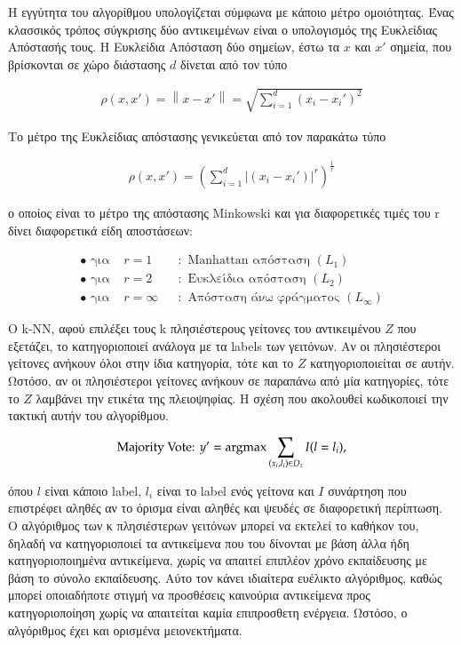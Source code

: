 \documentclass[12pt]{article}
\newcommand{\norm}[1]{\left\lVert#1\right\rVert}
\newcommand{\argmax}{\operatornamewithlimits{argmax}}
\begin{document}
Η εγγύτητα του αλγορίθμου υπολογίζεται σύμφωνα με κάποιο μέτρο ομοιότητας. Ένας κλασσικός τρόπος σύγκρισης δύο αντικειμένων είναι ο υπολογισμός της Ευκλείδιας Απόστασής τους. Η Ευκλείδια Απόσταση δύο σημείων, έστω τα \(x\) και \(x'\) σημεία, που βρίσκονται σε χώρο διάστασης \(d\) δίνεται από τον τύπο

\begin{align*}
	ρ(x,x') = \norm{x- x'} =\sqrt{\sum_{i=1}^{d}(x_i - x_{i}')^2}
\end{align*} 

Το μέτρο της Ευκλείδιας απόστασης γενικεύεται από τον παρακάτω τύπο

\begin{align*}
	ρ(x,x') = (\sum_{i=1}^{d}|(x_i - x_{i}')|^r)^{\frac{1}{r}}
\end{align*}

ο οποίος είναι το μέτρο της απόστασης Minkowski και για διαφορετικές τιμές του r δίνει διαφορετικά είδη αποστάσεων:

\begin{align*}
	\bullet \text{ για } &r = 1 &&: \text{ Manhattan απόσταση } (L_1) \\
	\bullet \text{ για } &r = 2 &&: \text{ Ευκλείδια απόσταση } (L_2) \\
	\bullet \text{ για } &r = \infty &&: \text{ Απόσταση άνω φράγματος } (L_{\infty})		
\end{align*}

O k-NN, αφού επιλέξει τους k πλησιέστερους γείτονες του αντικειμένου \(Z\) που εξετάζει, το κατηγοριοποιεί ανάλογα με τα labels των γειτόνων. Αν οι πλησιέστεροι γείτονες ανήκουν όλοι στην ίδια κατηγορία, τότε και το \(Ζ\) κατηγοριοποιείται σε αυτήν. Ωστόσο, αν οι πλησιέστεροι γείτονες ανήκουν σε παραπάνω από μία κατηγορίες, τότε το \(Z\) λαμβάνει την ετικέτα της πλειοψηφίας. Η σχέση που ακολουθεί κωδικοποιεί την τακτική αυτήν του αλγορίθμου.

\begin{align*}
	\text{Majority Vote: } y' = \argmax \sum_{(x_i, l_i) \in D_z} I(l = l_i),
\end{align*} 

όπου \(l\) είναι κάποιο label, \(l_i\) είναι το label ενός γείτονα και \(I\) συνάρτηση που επιστρέφει αληθές αν το όρισμα είναι αληθές και ψευδές σε διαφορετική περίπτωση. \\

Ο αλγόριθμος των κ πλησιέστερων γειτόνων μπορεί να εκτελεί το καθήκον του, δηλαδή να κατηγοριοποιεί τα αντικείμενα που του δίνονται με βάση άλλα ήδη κατηγοριοποιημένα αντικείμενα, χωρίς να απαιτεί επιπλέον χρόνο εκπαίδευσης με βάση το σύνολο εκπαίδευσης. Αύτο τον κάνει ιδιαίτερα ευέλικτο αλγόριθμος, καθώς μπορεί οποιαδήποτε στιγμή να προσθέσεις καινούρια αντικείμενα προς κατηγοριοποίηση χωρίς να απαιτείται καμία επιπροσθετη ενέργεια. Ωστόσο, ο αλγόριθμος έχει και ορισμένα μειονεκτήματα. \\
\end{document}
